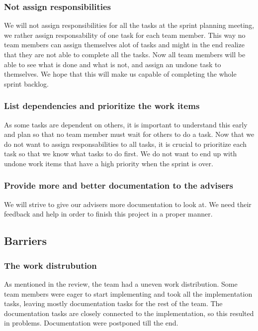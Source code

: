 \subsubsection{Not assign responsibilities}
We will not assign responsibilities for all the tasks at the sprint planning meeting, we rather assign responsability of one task for each team member. This way no team members can assign themselves alot of tasks and might in the end realize that they are not able to complete all the tasks. Now all team members will be able to see what is done and what is not, and assign an undone task to themselves. We hope that this will make us capable of completing the whole sprint backlog.

\subsubsection{List dependencies and prioritize the work items}
As some tasks are dependent on others, it is important to understand this early and plan so that no team member must wait for others to do a task. Now that we do not want to assign responsabilities to all tasks, it is crucial to prioritize each task so that we know what tasks to do first. We do not want to end up with undone work items that have a high priority when the sprint is over.

\subsubsection{Provide more and better documentation to the advisers}
We will strive to give our advisers more documentation to look at. We need their feedback and help in order to finish this project in a proper manner. 


\subsection{Barriers}
\subsubsection{The work distrubution} 
As mentioned in the review, the team had a uneven work distribution. Some team members were eager to start implementing and took all the implementation tasks, leaving mostly documentation tasks for the rest of the team. The documentation tasks are closely connected to the implementation, so this resulted in problems. Documentation were postponed till the end.

